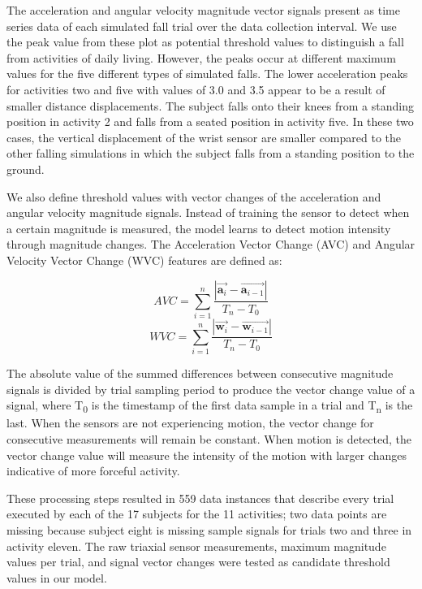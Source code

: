 \documentclass{llncs}
\begin{document}
\begin{table}
\begin{center}
\begin{tabular}{|c|c|c|}
			\bottomrule
		\end{tabular}
	\end{center}
\end{table}

	The acceleration and angular velocity magnitude vector signals present as time series data of each simulated fall trial over the data collection interval. We use the peak value from these plot as potential threshold values to distinguish a fall from activities of daily living. However, the peaks occur at different maximum values for the five different types of simulated falls. The lower acceleration peaks for activities two and five with values of 3.0 and 3.5 appear to be a result of smaller distance displacements. The subject falls onto their knees from a standing position in activity 2 and falls from a seated position in activity five. In these two cases, the vertical displacement of the wrist sensor are smaller compared to the other falling simulations in which the subject falls from a standing position to the ground.

	We also define threshold values with vector changes of the acceleration and angular velocity magnitude signals. Instead of training the sensor to detect when a certain magnitude is measured, the model learns to detect motion intensity through magnitude changes. The Acceleration Vector Change (AVC) and Angular Velocity Vector Change (WVC) features are defined as:

	\begin{equation*}
    		AVC = \sum\limits_{i=1}^n \frac{| \vec{\mathbf{a}_{i}} - \vec{\mathbf{a}_{i-1}} |}{T_{n} - T_{0}}
	\end{equation*} 
	\begin{equation*}
		WVC = \sum\limits_{i=1}^n \frac{| \vec{\mathbf{w}_{i}} - \vec{\mathbf{w}_{i-1}} |}{T_{n} - T_{0}}
	\end{equation*} 

	The absolute value of the summed differences between consecutive magnitude signals is divided by trial sampling period to produce the vector change value of a signal, where T\textsubscript{0} is the timestamp of the first data sample in a trial and T\textsubscript{n} is the last. When the sensors are not experiencing motion, the vector change for consecutive measurements will remain be constant. When motion is detected, the vector change value will measure the intensity of the motion with larger changes indicative of more forceful activity. 
	
	These processing steps resulted in 559 data instances that describe every trial executed by each of the 17 subjects for the 11 activities; two data points are missing because subject eight is missing sample signals for trials two and three in activity eleven. The raw triaxial sensor measurements, maximum magnitude values per trial, and signal vector changes were tested as candidate threshold values in our model. 
	
\end{document}
